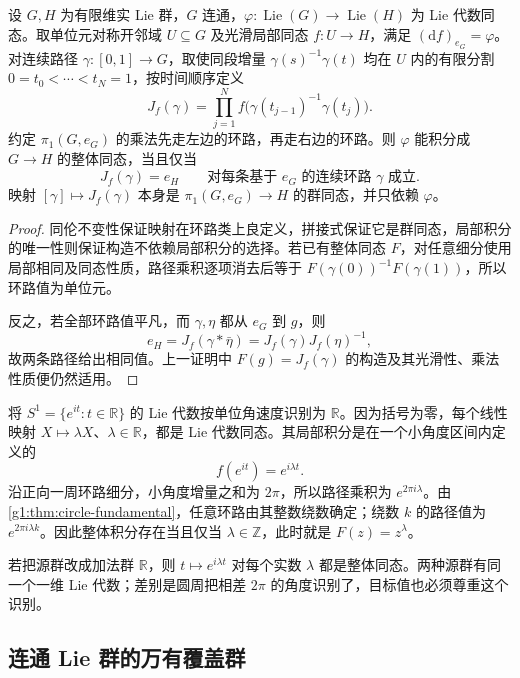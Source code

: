 \begin{corollary}
	\label{g1:cor:lie-integration-loop-criterion}
	设 \(G,H\) 为有限维实 Lie 群，\(G\) 连通，\(\varphi:\operatorname{Lie}(G)\to\operatorname{Lie}(H)\) 为 Lie 代数同态。取单位元对称开邻域 \(U\subseteq G\) 及光滑局部同态 \(f:U\to H\)，满足 \((\mathrm{d}f)_{e_G}=\varphi\)。对连续路径 \(\gamma:[0,1]\to G\)，取使同段增量 \(\gamma(s)^{-1}\gamma(t)\) 均在 \(U\) 内的有限分割 \(0=t_0<\cdots<t_N=1\)，按时间顺序定义
	\[
		J_f(\gamma)=\prod_{j=1}^N f\bigl(\gamma(t_{j-1})^{-1}\gamma(t_j)\bigr).
	\]
	约定 \(\pi_1(G,e_G)\) 的乘法先走左边的环路，再走右边的环路。则 \(\varphi\) 能积分成 \(G\to H\) 的整体同态，当且仅当
	\[
		J_f(\gamma)=e_H
		\qquad\text{对每条基于 }e_G\text{ 的连续环路 }\gamma\text{ 成立}.
	\]
	映射 \([\gamma]\mapsto J_f(\gamma)\) 本身是 \(\pi_1(G,e_G)\to H\) 的群同态，并只依赖 \(\varphi\)。
\end{corollary}
\begin{proof}
	同伦不变性保证映射在环路类上良定义，拼接式保证它是群同态，局部积分的唯一性则保证构造不依赖局部积分的选择。若已有整体同态 \(F\)，对任意细分使用局部相同及同态性质，路径乘积逐项消去后等于
	\(F(\gamma(0))^{-1}F(\gamma(1))\)，所以环路值为单位元。

	反之，若全部环路值平凡，而 \(\gamma,\eta\) 都从 \(e_G\) 到 \(g\)，则
	\[
		e_H=J_f(\gamma*\bar\eta)=J_f(\gamma)J_f(\eta)^{-1},
	\]
	故两条路径给出相同值。上一证明中 \(F(g)=J_f(\gamma)\) 的构造及其光滑性、乘法性质便仍然适用。
\end{proof}

\begin{example}
	\label{g1:exm:circle-lie-integration-obstruction}
	将 \(S^1=\{e^{it}:t\in\mathbb R\}\) 的 Lie 代数按单位角速度识别为 \(\mathbb R\)。因为括号为零，每个线性映射 \(X\mapsto\lambda X\)、\(\lambda\in\mathbb R\)，都是 Lie 代数同态。其局部积分是在一个小角度区间内定义的
	\[
		f(e^{it})=e^{i\lambda t}.
	\]
	沿正向一周环路细分，小角度增量之和为 \(2\pi\)，所以路径乘积为 \(e^{2\pi i\lambda}\)。由\cref{g1:thm:circle-fundamental}，任意环路由其整数绕数确定；绕数 \(k\) 的路径值为 \(e^{2\pi i\lambda k}\)。因此整体积分存在当且仅当 \(\lambda\in\mathbb Z\)，此时就是 \(F(z)=z^\lambda\)。

	若把源群改成加法群 \(\mathbb R\)，则 \(t\mapsto e^{i\lambda t}\) 对每个实数 \(\lambda\) 都是整体同态。两种源群有同一个一维 Lie 代数；差别是圆周把相差 \(2\pi\) 的角度识别了，目标值也必须尊重这个识别。
\end{example}

\subsection{连通 Lie 群的万有覆盖群}
\label{g1:subsec:1604:04}

